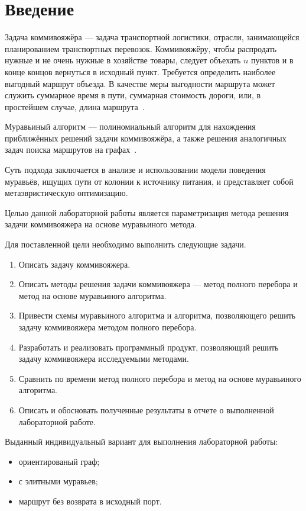 \chapter*{Введение}

Задача коммивояжёра --- задача транспортной логистики, отрасли, занимающейся планированием транспортных перевозок.
Коммивояжёру, чтобы распродать нужные и не очень нужные в хозяйстве товары, следует объехать $n$ пунктов и в конце концов вернуться в исходный пункт.
Требуется определить наиболее выгодный маршрут объезда. В качестве меры выгодности маршрута может служить суммарное время в пути, суммарная стоимость дороги, или, в простейшем случае, длина маршрута~\cite{comi}.

Муравьиный алгоритм --- полиномиальный алгоритм для нахождения приближённых решений задачи коммивояжёра, а также решения аналогичных задач поиска маршрутов на графах~\cite{comi}.

Суть подхода заключается в анализе и использовании модели поведения муравьёв, ищущих пути от колонии к источнику питания, и представляет собой метаэвристическую оптимизацию.

Целью данной лабораторной работы является параметризация метода решения задачи коммивояжера на основе муравьиного метода.

Для поставленной цели необходимо выполнить следующие задачи.
\begin{enumerate}
	\item Описать задачу коммивояжера.
	\item Описать методы решения задачи коммивояжера --- метод полного перебора и метод на основе муравьиного алгоритма.
	\item Привести схемы муравьиного алгоритма и алгоритма, позволяющего решить задачу коммивояжера методом полного перебора.
	\item Разработать и реализовать программный продукт, позволяющий решить задачу коммивояжера исследуемыми методами.
	\item Сравнить по времени метод полного перебора и метод на основе муравьиного алгоритма.
	\item Описать и обосновать полученные результаты в отчете о выполненной лабораторной работе.
\end{enumerate}

Выданный индивидуальный вариант для выполнения лабораторной работы:
\begin{itemize}
	\item ориентированый граф;
	\item с элитными муравьев;
	\item маршрут без возврата в исходный порт.
\end{itemize}